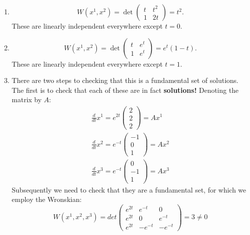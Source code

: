 \documentclass[a4paper,12pt,leqno]{article}
\begin{document}

\begin{enumerate}
\item \[ W(x^1,x^2) = \det \begin{pmatrix}
t & t^2 \\
1 & 2t
\end{pmatrix} = t^2. \]
These are linearly independent everywhere except $t = 0.$
\item \[ W(x^1,x^2) = \det \begin{pmatrix}
t & e^t \\
1 & e^t
\end{pmatrix} = e^t(1-t). \]
These are linearly independent everywhere except $t = 1.$
\item There are two steps to checking that this is a fundamental set of solutions. The first is to check that each of these are in fact \textbf{solutions!} Denoting the matrix by $A$:
\begin{align*}
\frac{d}{dt}x^1 = e^{2t} \begin{pmatrix}
2\\
2\\
2
\end{pmatrix}
= A x^1 \\
\frac{d}{dt}x^2 = e^{-t} \begin{pmatrix}
-1\\
0\\
1
\end{pmatrix}
= A x^2 \\
\frac{d}{dt}x^3 = e^{-t} \begin{pmatrix}
0\\
-1\\
1
\end{pmatrix}
= A x^3 
 \end{align*}
 Subsequently we need to check that they are a fundamental set, for which we employ the Wronskian:
 \[ W(x^1,x^2,x^3) = det\begin{pmatrix}
 e^{2t} & e^{-t} & 0 \\
  e^{2t} & 0 & e^{-t} \\
  e^{2t} & -e^{-t} & -e^{-t} 
    \end{pmatrix}
    = 3 \neq 0 \]


\end{enumerate}
\end{document}
